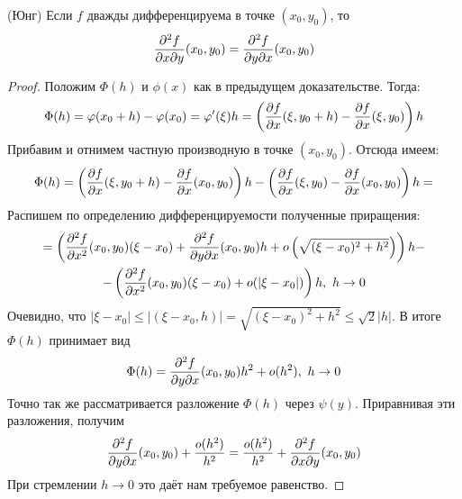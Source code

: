 \begin{theorem} (Юнг)
	Если $f$ дважды дифференцируема в точке $(x_0, y_0)$, то
	\[
		\frac{\partial^2 f}{\partial x \partial y} (x_0, y_0) = \frac{\partial^2 f}{\partial y \partial x} (x_0, y_0)
	\]
\end{theorem}

\begin{proof}
	Положим $\Phi(h)$ и $\phi(x)$ как в предыдущем доказательстве. Тогда:
	\[
		\Phi(h) = \varphi(x_0 + h) - \varphi(x_0) = \varphi'(\xi) h = \left(\frac{\partial f}{\partial x} (\xi, y_0 + h) - \frac{\partial f}{\partial x} (\xi, y_0)\right) h
	\]
	Прибавим и отнимем частную производную в точке $(x_0, y_0)$. Отсюда имеем:
	\[
		\Phi(h) = \left(\frac{\partial f}{\partial x} (\xi, y_0 + h) - \frac{\partial f}{\partial x} (x_0, y_0)\right) h - \left(\frac{\partial f}{\partial x} (\xi, y_0) - \frac{\partial f}{\partial x} (x_0, y_0)\right) h =
	\]
	Распишем по определению дифференцируемости полученные приращения:
	\begin{multline*}
		=\left(\frac{\partial^2 f}{\partial x^2} (x_0, y_0) (\xi - x_0) + \frac{\partial^2 f}{\partial y \partial x} (x_0, y_0) h + o\left(\sqrt{(\xi - x_0)^2 + h^2}\right)\right) h -
		\\
		-\left(\frac{\partial^2 f}{\partial x^2} (x_0, y_0) (\xi - x_0) + o(|\xi - x_0|)\right) h,\ h\to 0
	\end{multline*}
	Очевидно, что $|\xi - x_0| \leq |(\xi - x_0, h)| = \sqrt{(\xi - x_0)^2 + h^2} \leq \sqrt{2}|h|$.
	В итоге $\Phi(h)$ принимает вид
	\[
		\Phi(h) = \frac{\partial^2 f}{\partial y \partial x} (x_0, y_0) h^2 + o(h^2),\ h\to 0
	\]
	Точно так же рассматривается разложение $\Phi(h)$ через $\psi(y)$. Приравнивая эти разложения, получим
	\[
		\frac{\partial^2 f}{\partial y \partial x} (x_0, y_0) + \frac{o(h^2)}{h^2} = \frac{o(h^2)}{h^2} + \frac{\partial^2 f}{\partial x \partial y} (x_0, y_0)
	\]
	При стремлении $h \to 0$ это даёт нам требуемое равенство.
\end{proof}

